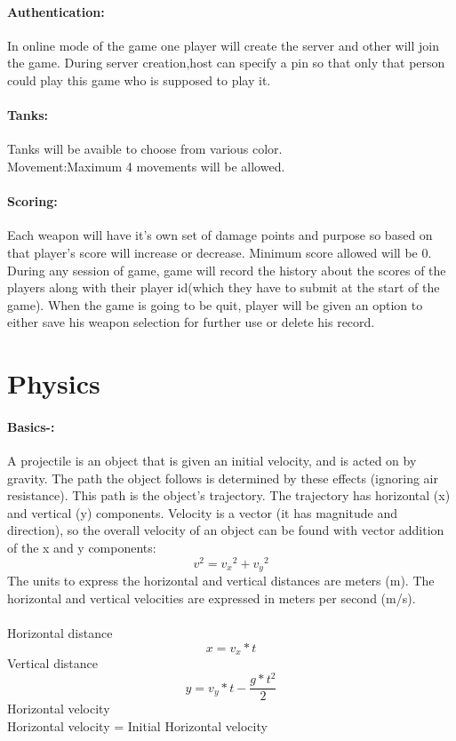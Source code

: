 \documentclass[12pt]{extarticle}
\begin{document}
\paragraph{Authentication:}
In online mode of the game one player will create the server and other will join the game. During server creation,host can specify a pin so that only that person could play this game who is supposed to play it.

\paragraph{Tanks: }
Tanks will be avaible to choose from various color.
\\Movement:Maximum 4 movements will be allowed.

\paragraph{Scoring:}
Each weapon will have it's own set of damage points and purpose so based on that player's score will increase or decrease. Minimum score allowed will be 0.\\
		During any session of game, game will record the history about the scores of the players along with their player id(which  they have to submit at the start of the game). When the game is going to be quit, player will be given an option to either save his weapon selection for further use or delete his record.		
\section{Physics}		


\paragraph{Basics-:} A projectile is an object that is given an initial velocity, and is acted on by gravity. The path the object follows is determined by these effects (ignoring air resistance). This path is the object's trajectory. The trajectory has horizontal (x) and vertical (y) components. Velocity is a vector (it has magnitude and direction), so the overall velocity of an object can be found with vector addition of the x and y components: $$v^{2} = {v_{x}}^{2} + {v_{y}}^{2}$$The units to express the horizontal and vertical distances are meters (m). The horizontal and vertical velocities are expressed in meters per second (m/s).\\
\\
Horizontal distance
$$x = v_{x}*t$$
Vertical distance
$$y = v_{y}*t - \frac{g*t^{2}}{2}$$
Horizontal velocity\\Horizontal velocity = Initial Horizontal velocity
\end{document}
